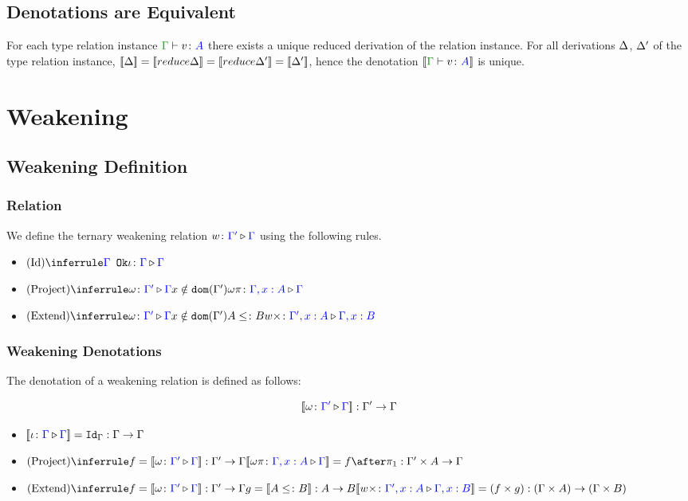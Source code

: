 \documentclass{report}
\begin{document}
\section{Denotations are Equivalent}
For each type relation instance $\gtyperelation{v}{A}$ there exists a unique reduced derivation of the relation instance. For all derivations $\Delta$, $\Delta'$ of the type relation instance, $\deno{\D} = \deno{\reduce{\D}} = \deno{\reduce{\D'}} = \deno{\D'} $, hence the denotation $\deno{\gtyperelation{v}{A}}$ is unique.


\chapter{Weakening}
\section{Weakening Definition}
\subsection{Relation}
We define the ternary weakening relation $w \colon {\color{blue}\Gamma'} \triangleright {\color {blue} \Gamma}$ using the following rules.


\begin{itemize}
    \item $\ntreeruleI{Id}{\ok{\G}}{\wrel{\i}{\G}{\G}}$
    \item $\ntreeruleII{Project}{\wrel{\w}{\G'}{\G}}{ x \notin \dom{\G'}}{\wrel{\w \pi}{\G, x: A}{\G}}$
    \item $\ntreeruleIII{Extend}{\wrel{\w}{\G'}{\G}}{ x \notin \dom{\G'}}{ A \subtype B}{\wrel{w \x}{\G', x: A}{\G, x: B}}$
\end{itemize}

\subsection{Weakening Denotations}
The denotation of a weakening relation is defined as follows:

\begin{equation}
    {\bf [\![}\omega \colon {\color{blue}\Gamma'} \triangleright {\color {blue} \Gamma}{\bf ]\!]}: \Gamma' \rightarrow \Gamma
\end{equation}

\begin{itemize}
    \item ${\bf [\![}\iota \colon {\color{blue}\Gamma} \triangleright {\color {blue} \Gamma}{\bf ]\!]} = \texttt{Id}_{\Gamma}: \Gamma \rightarrow \Gamma$
    
    \item $\ntreeruleI{Project}{f = \deno{\wrel{\w}{\G'}{\G}}: \G' \rightarrow \G}{\deno{\wrel{\w \pi}{\G, x: A}{\G}} = f\after \p: \G'\times A \rightarrow \G}$
    
    \item $\ntreeruleII{Extend}{f = \deno{\wrel{\w}{\G'}{\G}}: \G' \rightarrow \G }{ g = \deno{A \subtype B}: A \rightarrow B}{\deno{\wrel{w \x}{\G', x: A}{\G, x: B}} = (f\times g): (\G\times A)\rightarrow(\G\times B)}$
\end{itemize}
\end{document}
